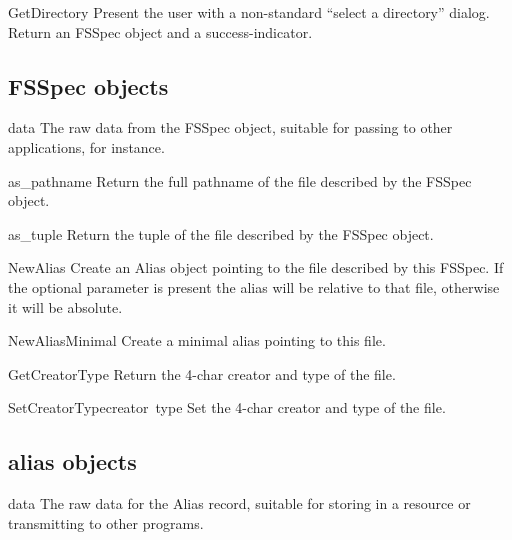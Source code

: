 \begin{funcdesc}{GetDirectory}{}
Present the user with a non-standard ``select a directory''
dialog. Return an FSSpec object and a success-indicator.
\end{funcdesc}

\subsection{FSSpec objects}

\renewcommand{\indexsubitem}{(FSSpec object method)}
\begin{datadesc}{data}
The raw data from the FSSpec object, suitable for passing
to other applications, for instance.
\end{datadesc}

\begin{funcdesc}{as_pathname}{}
Return the full pathname of the file described by the FSSpec object.
\end{funcdesc}

\begin{funcdesc}{as_tuple}{}
Return the  tuple of the file described
by the FSSpec object.
\end{funcdesc}

\begin{funcdesc}{NewAlias}{}
Create an Alias object pointing to the file described by this
FSSpec. If the optional  parameter is present the alias
will be relative to that file, otherwise it will be absolute.
\end{funcdesc}

\begin{funcdesc}{NewAliasMinimal}{}
Create a minimal alias pointing to this file.
\end{funcdesc}

\begin{funcdesc}{GetCreatorType}{}
Return the 4-char creator and type of the file.
\end{funcdesc}

\begin{funcdesc}{SetCreatorType}{creator\, type}
Set the 4-char creator and type of the file.
\end{funcdesc}

\subsection{alias objects}

\renewcommand{\indexsubitem}{(alias object method)}
\begin{datadesc}{data}
The raw data for the Alias record, suitable for storing in a resource
or transmitting to other programs.
\end{datadesc}

